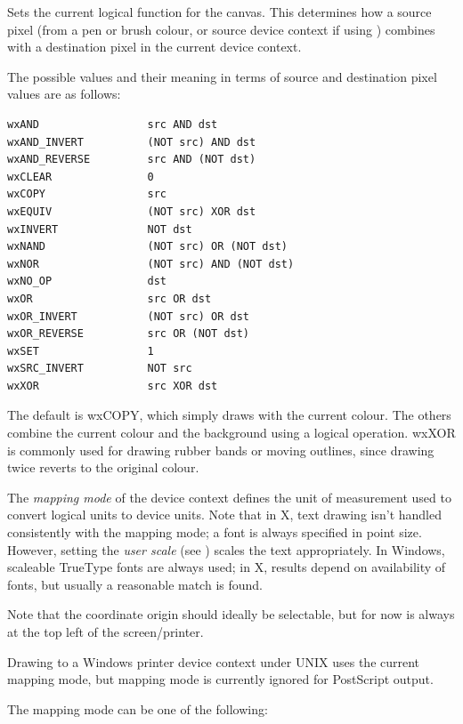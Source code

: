 Sets the current logical function for the canvas.  This determines how
a source pixel (from a pen or brush colour, or source device context if
using ) combines with a destination pixel in the
current device context.

The possible values
and their meaning in terms of source and destination pixel values are
as follows:

\begin{verbatim}
wxAND                 src AND dst
wxAND_INVERT          (NOT src) AND dst
wxAND_REVERSE         src AND (NOT dst)
wxCLEAR               0
wxCOPY                src
wxEQUIV               (NOT src) XOR dst
wxINVERT              NOT dst
wxNAND                (NOT src) OR (NOT dst)
wxNOR                 (NOT src) AND (NOT dst)
wxNO_OP               dst
wxOR                  src OR dst
wxOR_INVERT           (NOT src) OR dst
wxOR_REVERSE          src OR (NOT dst)
wxSET                 1
wxSRC_INVERT          NOT src
wxXOR                 src XOR dst
\end{verbatim}

The default is wxCOPY, which simply draws with the current colour.
The others combine the current colour and the background using a
logical operation.  wxXOR is commonly used for drawing rubber bands or
moving outlines, since drawing twice reverts to the original colour.

\label{wxdcsetmapmode}


The {\it mapping mode} of the device context defines the unit of
measurement used to convert logical units to device units. Note that
in X, text drawing isn't handled consistently with the mapping mode; a
font is always specified in point size. However, setting the {\it
user scale} (see ) scales the text appropriately. In
Windows, scaleable TrueType fonts are always used; in X, results depend
on availability of fonts, but usually a reasonable match is found.

Note that the coordinate origin should ideally be selectable, but for
now is always at the top left of the screen/printer.

Drawing to a Windows printer device context under UNIX
uses the current mapping mode, but mapping mode is currently ignored for
PostScript output.

The mapping mode can be one of the following:

